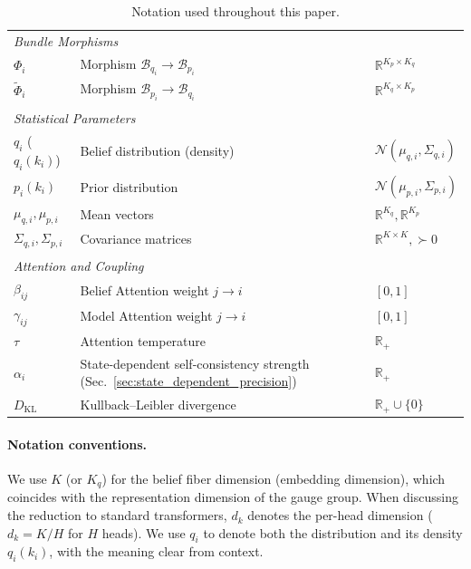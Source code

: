 \documentclass[twoside,11pt]{article}
\begin{document}
\begin{table}[h]
\begin{tabularx}{\textwidth}{l>{\raggedright\arraybackslash}Xl}
\\
\multicolumn{3}{l}{\textit{Bundle Morphisms}} \\
$\Phi_i$ & Morphism $\mathcal{B}_{q_i} \to \mathcal{B}_{p_i}$ & $\mathbb{R}^{K_p\times K_q}$ \\
$\tilde{\Phi}_i$ & Morphism $\mathcal{B}_{p_i} \to \mathcal{B}_{q_i}$ & $\mathbb{R}^{K_q\times K_p}$ \\
\\
\multicolumn{3}{l}{\textit{Statistical Parameters}} \\
$q_i$ ($q_i(k_i)$) & Belief distribution (density) & $\mathcal{N}(\mu_{q,i},\Sigma_{q,i})$ \\
$p_i(k_i)$ & Prior distribution & $\mathcal{N}(\mu_{p,i},\Sigma_{p,i})$ \\
$\mu_{q,i},\mu_{p,i}$ & Mean vectors & $\mathbb{R}^{K_q},\mathbb{R}^{K_p}$ \\
$\Sigma_{q,i},\Sigma_{p,i}$ & Covariance matrices & $\mathbb{R}^{K\times K},\succ0$ \\
\\
\multicolumn{3}{l}{\textit{Attention and Coupling}} \\
$\beta_{ij}$ & Belief Attention weight $j\!\to\!i$ & $[0,1]$ \\
$\gamma_{ij}$ & Model Attention weight $j\!\to\!i$ & $[0,1]$ \\
$\tau$ & Attention temperature & $\mathbb{R}_+$ \\
$\alpha_i$ & State-dependent self-consistency strength (Sec.~\ref{sec:state_dependent_precision}) & $\mathbb{R}_+$ \\
$D_{\mathrm{KL}}$ & Kullback–Leibler divergence & $\mathbb{R}_+\cup\{0\}$ \\
\hline
\end{tabularx}
\caption{Notation used throughout this paper.}
\label{tab:notation}
\end{table}



\paragraph{Notation conventions.} We use $K$ (or $K_q$) for the belief fiber dimension (embedding dimension), which coincides with the representation dimension of the gauge group. When discussing the reduction to standard transformers, $d_k$ denotes the per-head dimension ($d_k = K/H$ for $H$ heads). We use $q_i$ to denote both the distribution and its density $q_i(k_i)$, with the meaning clear from context.
\end{document}
